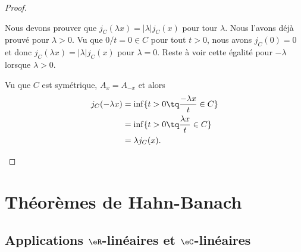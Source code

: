 \begin{proof}
\begin{subproof}
		Nous devons prouver que \( j_C(\lambda x)=| \lambda |j_C(x)\) pour tour \( \lambda\). Nous l'avons déjà prouvé pour \( \lambda>0\). Vu que \( 0/t=0\in C\) pour tout \( t>0\), nous avons \( j_C(0)=0\) et donc \( j_C(\lambda x)=| \lambda |j_C(x)\) pour \( \lambda=0\). Reste à voir cette égalité pour \( -\lambda\) lorsque \( \lambda>0\).

		Vu que \( C\) est symétrique, \( A_x=A_{-x}\) et alors
		\begin{subequations}
			\begin{align}
				j_C(-\lambda x) & =\inf\{ t>0\tq \frac{ -\lambda x }{ t }\in C \} \\
				                & =\inf\{ t>0\tq \frac{ \lambda x }{ t }\in C \}  \\
				                & =\lambda j_C(x).
			\end{align}
		\end{subequations}
	\end{subproof}
\end{proof}


\section{Théorèmes de Hahn-Banach}

\subsection{Applications \( \eR\)-linéaires et \( \eC\)-linéaires}

